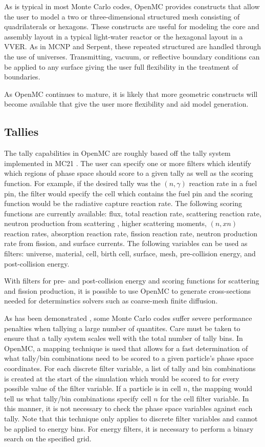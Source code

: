 \documentclass{elsarticle}
\begin{document}
As is typical in most Monte Carlo codes, OpenMC provides constructs that allow
the user to model a two or three-dimensional structured mesh consisting of
quadrilaterals or hexagons. These constructs are useful for modeling the core
and assembly layout in a typical light-water reactor or the hexagonal layout in
a VVER. As in MCNP and Serpent, these repeated structured are handled through
the use of universes. Transmitting, vacuum, or reflective boundary conditions
can be applied to any surface giving the user full flexibility in the treatment
of boundaries.

As OpenMC continues to mature, it is likely that more geometric constructs will
become available that give the user more flexibility and aid model generation.

\subsection{Tallies}

The tally capabilities in OpenMC are roughly based off the tally system
implemented in MC21 \cite{MC21}. The user can specify one or more filters which
identify which regions of phase space should score to a given tally as well as
the scoring function. For example, if the desired tally was the $(n,\gamma)$
reaction rate in a fuel pin, the filter would specify the cell which contains
the fuel pin and the scoring function would be the radiative capture reaction
rate. The following scoring functions are currently available: flux, total
reaction rate, scattering reaction rate, neutron production from scattering
\cite{herman}, higher scattering moments, $(n,xn)$ reaction rates, absorption
reaction rate, fission reaction rate, neutron production rate from fission, and
surface currents. The following variables can be used as filters: universe,
material, cell, birth cell, surface, mesh, pre-collision energy, and
post-collision energy.

With filters for pre- and post-collision energy and scoring functions for
scattering and fission production, it is possible to use OpenMC to generate
cross-sections needed for determinstics solvers such as coarse-mesh finite
diffusion.

As has been demonstrated \cite{mcnp-efficiency}, some Monte Carlo codes suffer
severe performance penalties when tallying a large number of quantites. Care
must be taken to ensure that a tally system scales well with the total number of
tally bins. In OpenMC, a mapping technique is used that allows for a fast
determination of what tally/bin combinations need to be scored to a given
particle's phase space coordinates. For each discrete filter variable, a list of
tally and bin combinations is created at the start of the simulation which would
be scored to for every possible value of the filter variable. If a particle is
in cell $n$, the mapping would tell us what tally/bin combinations specify cell
$n$ for the cell filter variable. In this manner, it is not necessary to check
the phase space variables against each tally. Note that this technique only
applies to discrete filter variables and cannot be applied to energy bins. For
energy filters, it is necessary to perform a binary search on the specified
grid.
\end{document}
